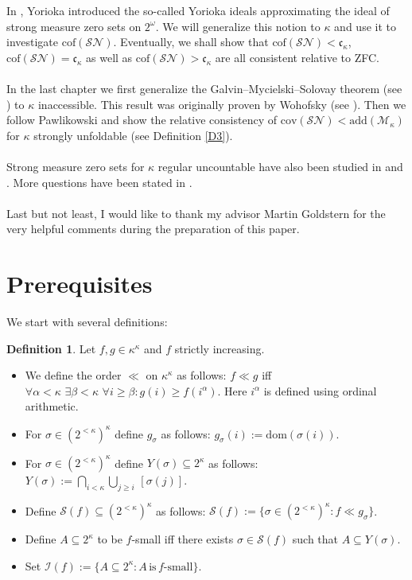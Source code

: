 \documentclass[12pt,a4paper]{scrartcl}
\theoremstyle{definition}
\newtheorem{definition}{Definition}[section]
\numberwithin{equation}{section}
\begin{document}
In \cite{Yorioka}, Yorioka introduced the so-called Yorioka ideals approximating the ideal of strong measure zero sets on $2^\omega$. We will generalize this notion to $\kappa$ and use it to investigate $\text{cof}(\mathcal{SN})$. Eventually, we shall show that $\text{cof}(\mathcal{SN}) < \mathfrak{c}_\kappa$, $\text{cof}(\mathcal{SN}) = \mathfrak{c}_\kappa$ as well as $\text{cof}(\mathcal{SN}) > \mathfrak{c}_\kappa$ are all consistent relative to ZFC.\\
\\
In the last chapter we first generalize the Galvin–Mycielski–Solovay theorem (see \cite{Judah}) to $\kappa$ inaccessible. This result was originally proven by Wohofsky (see \cite{Wohofsky}). Then we follow Pawlikowski \cite{Pawlikowski} and show the relative consistency of $\text{cov}(\mathcal{SN}) < \text{add}(\mathcal{M}_\kappa)$ for $\kappa$ strongly unfoldable (see Definition \ref{D3}).\\
\\
Strong measure zero sets for $\kappa$ regular uncountable have also been studied in \cite{Halko} and \cite{Halko2}. More questions have been stated in \cite{Questions}.\\
\\
Last but not least, I would like to thank my advisor Martin Goldstern for the very helpful comments during the preparation of this paper.

\section{Prerequisites}

We start with several definitions:

\begin{definition}
Let $f,g \in \kappa^\kappa$ and $f$ strictly increasing.
\begin{itemize}
\item We define the order $\ll$ on $\kappa^\kappa$ as follows:
$f\ll g$ iff $\forall \alpha < \kappa \, \, \exists \beta < \kappa \, \, \forall i \geq \beta \colon g(i) \geq f(i^\alpha)$. Here $i^\alpha$ is defined using ordinal arithmetic.
\item For $\sigma \in (2^{<\kappa})^\kappa$ define $g_\sigma$ as follows: $g_\sigma (i):= \text{dom}(\sigma(i))$.
\item For $\sigma \in (2^{<\kappa})^\kappa$ define $Y(\sigma) \subseteq 2^\kappa$ as follows: $Y(\sigma):= \bigcap_{i < \kappa} \bigcup_{j \geq i} \, [\sigma(j)]$.
\item Define $\mathcal{S}(f) \subseteq (2^{<\kappa})^\kappa$ as follows: $\mathcal{S}(f):=\{ \sigma \in (2^{<\kappa})^\kappa \colon f \ll g_\sigma\}$.
\item Define $A \subseteq 2^\kappa$ to be $f$-small iff there exists $\sigma \in \mathcal{S}(f)$ such that $A \subseteq Y(\sigma)$.
\item Set $\mathcal{I}(f):=\{A \subseteq 2^\kappa \colon A \, \text{is} \,  f\text{-small} \}$.
\end{itemize}
\end{definition}
\end{document}
